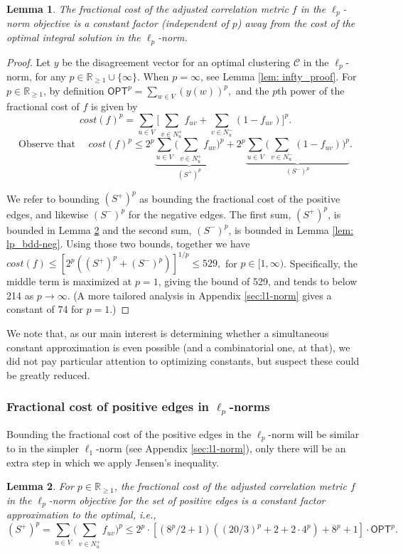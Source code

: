 \documentclass[11pt]{article}
\newtheorem{lemma}{Lemma}
\begin{document}
\begin{lemma}\label{lem:lp-bdd}
    The fractional cost of the adjusted correlation metric $f$ in the $\ell_p$-norm objective is a constant factor (independent of $p$) away from the cost of the optimal integral solution in the $\ell_p$-norm.
\end{lemma}
\begin{proof}
Let $y$ be the disagreement vector for an optimal clustering $\mathcal{C}$ in the $\ell_p$-norm, for any $p \in \mathbb{R}_{\geq 1} \cup \{\infty\}$. 
When $p = \infty$, see Lemma \ref{lem: infty_proof}.
For $p\in \mathbb{R}_{\geq 1}$,
by definition $\textsf{OPT}^p = \sum_{w \in V} (y(w))^p,$
and the $p$th power of the fractional cost of $f$ is given by 
\[cost(f)^p = \sum_{u \in V} \Big[ \sum_{v \in N_u^+} f_{uv} + \sum_{v \in N_u^-} (1-f_{uv})\Big]^p.\]
\[\text{Observe that }\quad cost(f)^p \leq 2^p \underbrace{\sum_{u \in V} \Big(\sum_{v \in N_u^+} f_{uv} \Big)^p}_{(S^+)^p} + 2^p \underbrace{\sum_{u \in V} \Big(\sum_{v \in N_u^-} (1-f_{uv}) \Big)^p}_{(S^-)^p}.\]

We refer to bounding $(S^+)^p$ as bounding the fractional cost of the positive edges, and likewise $(S^-)^p$ for the negative edges. 
The first sum, $(S^+)^p$, is bounded in Lemma \ref{lem: lp_bdd-pos} and the second sum, $(S^-)^p$, is bounded in Lemma \ref{lem: lp_bdd-neg}. Using those two bounds, together we have 
$cost(f) \leq [2^p((S^+)^p + (S^-)^p)]^{1/p} \leq 529,$
for $p \in [1, \infty)$. Specifically, the middle term is maximized at $p=1$, giving the bound of 529, and tends to below 214 as $p \rightarrow \infty$. (A more tailored analysis in Appendix \ref{sec:l1-norm} gives a constant of 74 for $p=1$.)
\end{proof}
We note that, as our main interest is determining whether a simultaneous constant approximation is even possible (and a combinatorial one, at that), we did not pay particular attention to optimizing constants, but suspect these could be greatly reduced.

\subsubsection{Fractional cost of positive edges in $\ell_p$-norms} \label{sec: pos_edges_lp}

Bounding the fractional cost of the positive edges in the $\ell_p$-norm will be similar to in the simpler $\ell_1$-norm (see Appendix \ref{sec:l1-norm}), only there will be an extra step in which we apply Jensen's inequality. 
\begin{lemma} \label{lem: lp_bdd-pos}
    For $p \in \mathbb{R}_{\geq 1}$, the fractional cost of the adjusted correlation metric $f$ in the $\ell_p$-norm objective for the set of positive edges is a constant factor approximation to the optimal, i.e.,
    $$(S^+)^p =  \sum_{u \in V} \Big(\sum_{v \in N_u^+} f_{uv} \Big)^p \leq 
2^p \cdot [(8^p/2 +1)((20/3)^p + 2 + 2 \cdot 4^p) + 8^p +1 ] \cdot \textsf{OPT}^p.
$$
\end{lemma}
\end{document}
